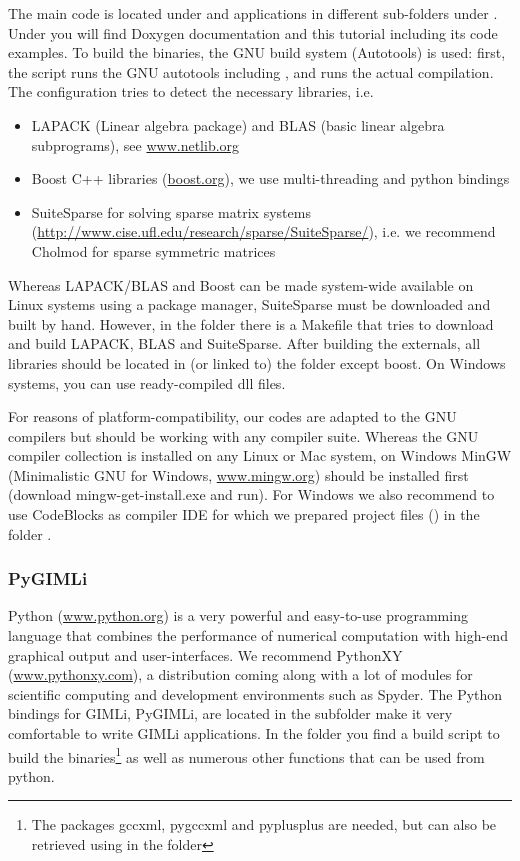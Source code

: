 The main code is located under  and applications in different sub-folders under .
Under  you will find Doxygen documentation and this tutorial including its code examples.
To build the binaries, the GNU build system (Autotools) is used: first, the script  runs the GNU autotools including , and  runs the actual compilation.
The configuration tries to detect the necessary libraries, i.e. 
\begin{itemize}
	\item LAPACK (Linear algebra package) and BLAS (basic linear algebra subprograms), see \url{www.netlib.org}
	\item Boost C++ libraries (\url{boost.org}), we use multi-threading and python bindings 
	\item SuiteSparse for solving sparse matrix systems (\url{http://www.cise.ufl.edu/research/sparse/SuiteSparse/}), i.e. we recommend Cholmod for sparse symmetric matrices
\end{itemize}
Whereas LAPACK/BLAS and Boost can be made system-wide available on Linux systems using a package manager, SuiteSparse must be downloaded and built by hand. 
However, in the folder  there is a Makefile that tries to download and build LAPACK, BLAS and SuiteSparse.
After building the externals, all libraries should be located in (or linked to) the folder  except boost. 
On Windows systems, you can use ready-compiled dll files.

For reasons of platform-compatibility, our codes are adapted to the GNU compilers but should be working with any compiler suite.
Whereas the GNU compiler collection is installed on any Linux or Mac system, on Windows MinGW (Minimalistic GNU for Windows, \url{www.mingw.org}) should be installed first (download mingw-get-install.exe and run).
For Windows we also recommend to use CodeBlocks as compiler IDE for which we prepared project files () in the folder .

\subsubsection*{PyGIMLi}
Python (\url{www.python.org}) is a very powerful and easy-to-use programming language that combines the performance of numerical computation with high-end graphical output and user-interfaces.
We recommend PythonXY (\url{www.pythonxy.com}), a distribution coming along with a lot of modules for scientific computing and development environments such as Spyder.
The Python bindings for GIMLi, PyGIMLi, are located in the subfolder  make it very comfortable to write GIMLi applications.
In the folder  you find a build script  to build the binaries\footnote{The packages gccxml, pygccxml and pyplusplus are needed, but can also be retrieved using  in the folder } as well as numerous other functions that can be used from python.

